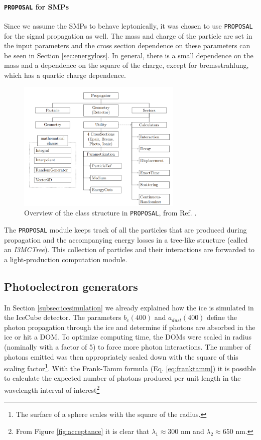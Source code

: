 \paragraph{\texttt{PROPOSAL} for SMPs}
Since we assume the SMPs to behave leptonically, it was chosen to use \texttt{PROPOSAL} for the signal propagation as well. The mass and charge of the particle are set in the input parameters and the cross section dependence on these parameters can be seen in Section \ref{sec:energyloss}. In general, there is a small dependence on the mass and a dependence on the square of the charge, except for bremsstrahlung, which has a quartic charge dependence.

\begin{figure}
\centering
\includegraphics[width=0.7\textwidth]{chapter6/img/proposal.png}
\caption{Overview of the class structure in \texttt{PROPOSAL}, from Ref. \cite{Dunsch:2018nsc}.}
\label{fig:proposal}
\end{figure}

\noindent The \texttt{PROPOSAL} module keeps track of all the particles that are produced during propagation and the accompanying energy losses in a tree-like structure (called an \textit{I3MCTree}). This collection of particles and their interactions are forwarded to a light-production computation module.

\subsection{Photoelectron generators}
In Section \ref{subsec:icesimulation} we already explained how the ice is simulated in the IceCube detector. The parameters $b_e(400)$ and $a_{dust}(400)$ define the photon propagation through the ice and determine if photons are absorbed in the ice or hit a DOM. To optimize computing time, the DOMs were scaled in radius (nominally with a factor of 5) to force more photon interactions. The number of photons emitted was then appropriately scaled down with the square of this scaling factor\footnote{The surface of a sphere scales with the square of the radius.}. With the Frank-Tamm formula (Eq. \ref{eq:franktamm}) it is possible to calculate the expected number of photons produced per unit length in the wavelength interval of interest\footnote{From Figure \ref{fig:acceptance} it is clear that $\lambda_1 \approx 300$ nm and $\lambda_2 \approx 650$ nm.}

